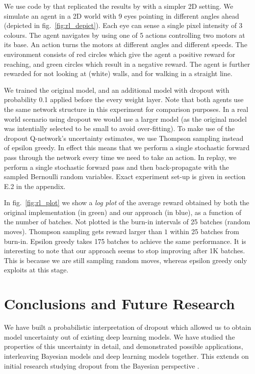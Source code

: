 \documentclass{article}
\theoremstyle{definition}
\begin{document}
We use code by \citep{convnetjs2015} that replicated the results by \citep{mnih2015human} with a simpler 2D setting. 
We simulate an agent in a 2D world with 9 eyes pointing in different angles ahead (depicted in fig.\ \ref{fig:rl_depict}). Each eye can sense a single pixel intensity of 3 colours. The agent navigates by using one of 5 actions controlling two motors at its base. An action turns the motors at different angles and different speeds. The environment consists of red circles which give the agent a positive reward for reaching, and green circles which result in a negative reward. The agent is further rewarded for not looking at (white) walls, and for walking in a straight line. 

We trained the original model, and an additional model with dropout with probability 0.1 applied before the every weight layer. Note that both agents use the same network structure in this experiment for comparison purposes. In a real world scenario using dropout we would use a larger model (as the original model was intentially selected to be small to avoid over-fitting).
To make use of the dropout Q-network's uncertainty estimates, we use Thompson sampling instead of epsilon greedy. In effect this means that we perform a single stochastic forward pass through the network every time we need to take an action. In replay, we perform a single stochastic forward pass and then back-propagate with the sampled Bernoulli random variables. Exact experiment set-up is given in section E.2 in the appendix.

In fig.\ \ref{fig:rl_plot} we show a \textit{log plot} of the average reward obtained by both the original implementation (in green) and our approach (in blue), as a function of the number of batches.
Not plotted is the burn-in intervals of 25 batches (random moves). 
Thompson sampling gets reward larger than $1$ within 25 batches from burn-in. Epsilon greedy takes 175 batches to achieve the same performance.
It is interesting to note that our approach seems to stop improving after 1K batches. This is because we are still sampling random moves, whereas epsilon greedy only exploits at this stage. 

\section{Conclusions and Future Research}

We have built a probabilistic interpretation of dropout which allowed us to obtain model uncertainty out of existing deep learning models. We have studied the properties of this uncertainty in detail, and demonstrated possible applications, interleaving Bayesian models and deep learning models together. 
This extends on initial research studying dropout from the Bayesian perspective \citep{Wang2013Fast,Maeda2014Bayesian}.
\end{document}
